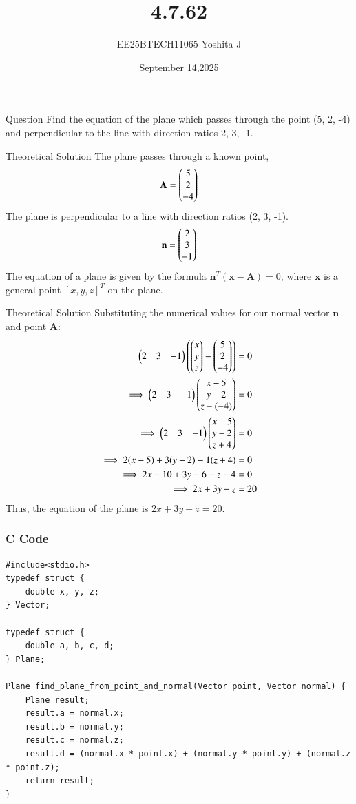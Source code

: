 \documentclass{beamer}
\begin{document}
\title 
{4.7.62}
\date{September 14,2025}


\author 
{EE25BTECH11065-Yoshita J}






\frame{\titlepage}
\begin{frame}{Question}
Find the equation of the plane which passes through the point (5, 2, -4) and perpendicular to the line with direction ratios 2, 3, -1.\\

\end{frame}


\begin{frame}{Theoretical Solution}
The plane passes through a known point,
\[ \mathbf{A} = \begin{pmatrix}5\\2\\-4\end{pmatrix} \]
The plane is perpendicular to a line with direction ratios (2, 3, -1). 
\[ \mathbf{n} = \begin{pmatrix}2\\3\\-1\end{pmatrix} \]
The equation of a plane is given by the formula $\mathbf{n}^T (\mathbf{x} - \mathbf{A}) = 0$, where $\mathbf{x}$ is a general point $[x, y, z]^T$ on the plane.
\end{frame}

\begin{frame}{Theoretical Solution}
Substituting the numerical values for our normal vector $\mathbf{n}$ and point $\mathbf{A}$:
\begin{align*}
    \begin{pmatrix}2 & 3 & -1\end{pmatrix} \left( \begin{pmatrix}x\\y\\z\end{pmatrix} - \begin{pmatrix}5\\2\\-4\end{pmatrix} \right) &= 0 \\
    \implies \begin{pmatrix}2 & 3 & -1\end{pmatrix} \begin{pmatrix}x-5\\y-2\\z-(-4)\end{pmatrix} &= 0 \\
    \implies \begin{pmatrix}2 & 3 & -1\end{pmatrix} \begin{pmatrix}x-5\\y-2\\z+4\end{pmatrix} &= 0 \\
    \implies 2(x-5) + 3(y-2) - 1(z+4) &= 0 \\
    \implies 2x - 10 + 3y - 6 - z - 4 &= 0 \\
    \implies 2x + 3y - z &= 20
\end{align*}
Thus, the equation of the plane is $2x + 3y - z = 20$.
\end{frame}

\begin{frame}[fragile]
    \frametitle{C Code}

    \begin{lstlisting}
#include<stdio.h>
typedef struct {
    double x, y, z;
} Vector;

typedef struct {
    double a, b, c, d;
} Plane;

Plane find_plane_from_point_and_normal(Vector point, Vector normal) {
    Plane result;
    result.a = normal.x;
    result.b = normal.y;
    result.c = normal.z;
    result.d = (normal.x * point.x) + (normal.y * point.y) + (normal.z * point.z);
    return result;
}
    \end{lstlisting}
\end{frame}
\end{document}
